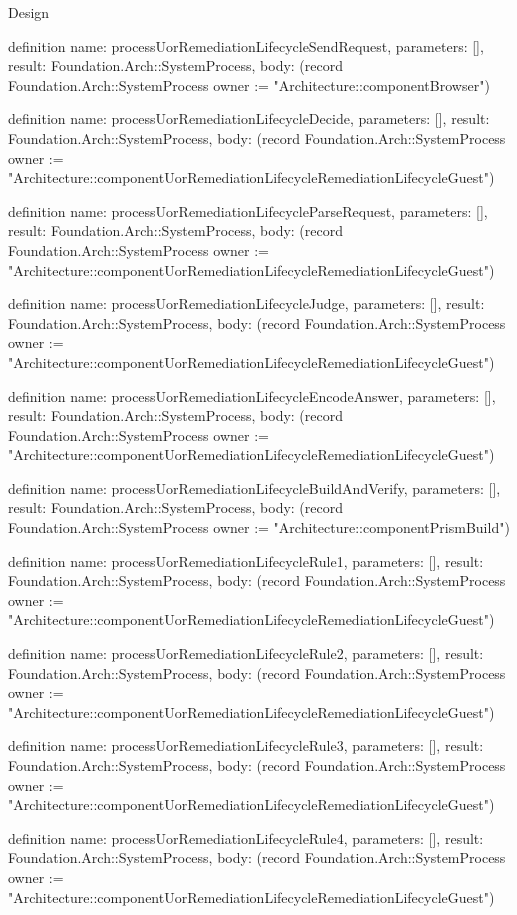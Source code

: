 \begin{lexlean}{Design}
\begin{semanticmodule}
definition{
  name: processUorRemediationLifecycleSendRequest,
  parameters: [],
  result: Foundation.Arch::SystemProcess,
  body: (record Foundation.Arch::SystemProcess {owner := "Architecture::componentBrowser"})
}

definition{
  name: processUorRemediationLifecycleDecide,
  parameters: [],
  result: Foundation.Arch::SystemProcess,
  body: (record Foundation.Arch::SystemProcess {owner := "Architecture::componentUorRemediationLifecycleRemediationLifecycleGuest"})
}

definition{
  name: processUorRemediationLifecycleParseRequest,
  parameters: [],
  result: Foundation.Arch::SystemProcess,
  body: (record Foundation.Arch::SystemProcess {owner := "Architecture::componentUorRemediationLifecycleRemediationLifecycleGuest"})
}

definition{
  name: processUorRemediationLifecycleJudge,
  parameters: [],
  result: Foundation.Arch::SystemProcess,
  body: (record Foundation.Arch::SystemProcess {owner := "Architecture::componentUorRemediationLifecycleRemediationLifecycleGuest"})
}

definition{
  name: processUorRemediationLifecycleEncodeAnswer,
  parameters: [],
  result: Foundation.Arch::SystemProcess,
  body: (record Foundation.Arch::SystemProcess {owner := "Architecture::componentUorRemediationLifecycleRemediationLifecycleGuest"})
}

definition{
  name: processUorRemediationLifecycleBuildAndVerify,
  parameters: [],
  result: Foundation.Arch::SystemProcess,
  body: (record Foundation.Arch::SystemProcess {owner := "Architecture::componentPrismBuild"})
}

definition{
  name: processUorRemediationLifecycleRule1,
  parameters: [],
  result: Foundation.Arch::SystemProcess,
  body: (record Foundation.Arch::SystemProcess {owner := "Architecture::componentUorRemediationLifecycleRemediationLifecycleGuest"})
}

definition{
  name: processUorRemediationLifecycleRule2,
  parameters: [],
  result: Foundation.Arch::SystemProcess,
  body: (record Foundation.Arch::SystemProcess {owner := "Architecture::componentUorRemediationLifecycleRemediationLifecycleGuest"})
}

definition{
  name: processUorRemediationLifecycleRule3,
  parameters: [],
  result: Foundation.Arch::SystemProcess,
  body: (record Foundation.Arch::SystemProcess {owner := "Architecture::componentUorRemediationLifecycleRemediationLifecycleGuest"})
}

definition{
  name: processUorRemediationLifecycleRule4,
  parameters: [],
  result: Foundation.Arch::SystemProcess,
  body: (record Foundation.Arch::SystemProcess {owner := "Architecture::componentUorRemediationLifecycleRemediationLifecycleGuest"})
}


\end{semanticmodule}
\end{lexlean}
